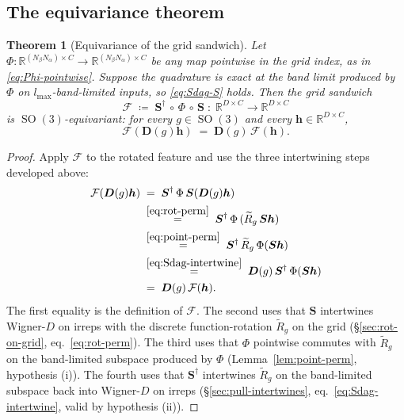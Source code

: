 \documentclass[11pt,a4paper]{article}
\DeclareMathOperator{\SO}{SO}
\newcommand{\R}{\mathbb{R}}
\newcommand{\bh}{\bm{h}}
\newcommand{\bD}{\bm{D}}
\newcommand{\lmax}{l_{\max}}
\theoremstyle{plain}
\newtheorem{theorem}{Theorem}
\theoremstyle{definition}
\theoremstyle{remark}
\begin{document}
\subsection{The equivariance theorem}\label{sec:eqv-thm}

\begin{theorem}[Equivariance of the grid sandwich]\label{thm:grid-sandwich}
    Let $\Phi\colon\R^{(N_\beta N_\alpha)\times C}\to\R^{(N_\beta N_\alpha)\times C}$ be any map pointwise in the grid index, as in \eqref{eq:Phi-pointwise}.
    Suppose the quadrature is exact at the band limit produced by $\Phi$ on $\lmax$-band-limited inputs, so \eqref{eq:Sdag-S} holds.
    Then the grid sandwich
    \begin{equation}\label{eq:sandwich}
        \mathcal{F}\;\coloneqq\;\bm{S}^{\dagger}\,\circ\,\Phi\,\circ\,\bm{S}\;\colon\;\R^{D\times C}\longrightarrow\R^{D\times C}
    \end{equation}
    is $\SO(3)$-equivariant: for every $g\in\SO(3)$ and every $\bh\in\R^{D\times C}$,
    \begin{equation}\label{eq:sandwich-equiv}
        \mathcal{F}(\bD(g)\bh)\;=\;\bD(g)\,\mathcal{F}(\bh).
    \end{equation}
\end{theorem}

\begin{proof}
    Apply $\mathcal{F}$ to the rotated feature and use the three intertwining steps developed above:
    \begin{align*}
        \mathcal{F}(\bD(g)\bh)
        \; & =\;\bm{S}^{\dagger}\,\Phi\,\bm{S}(\bD(g)\bh)                                           \\
        \; & \stackrel{\eqref{eq:rot-perm}}{=}\;\bm{S}^{\dagger}\,\Phi\,(\widetilde R_g\,\bm{S}\bh) \\
        \; & \stackrel{\eqref{eq:point-perm}}{=}\;\bm{S}^{\dagger}\,\widetilde R_g\,\Phi(\bm{S}\bh) \\
        \; & \stackrel{\eqref{eq:Sdag-intertwine}}{=}\;\bD(g)\,\bm{S}^{\dagger}\,\Phi(\bm{S}\bh)    \\
        \; & =\;\bD(g)\,\mathcal{F}(\bh).
    \end{align*}
    The first equality is the definition of $\mathcal{F}$.
    The second uses that $\bm{S}$ intertwines Wigner-$D$ on irreps with the discrete function-rotation $\widetilde R_g$ on the grid (\S\ref{sec:rot-on-grid}, eq.~\eqref{eq:rot-perm}).
    The third uses that $\Phi$ pointwise commutes with $\widetilde R_g$ on the band-limited subspace produced by $\Phi$ (Lemma~\ref{lem:point-perm}, hypothesis (i)).
    The fourth uses that $\bm{S}^{\dagger}$ intertwines $\widetilde R_g$ on the band-limited subspace back into Wigner-$D$ on irreps (\S\ref{sec:pull-intertwines}, eq.~\eqref{eq:Sdag-intertwine}, valid by hypothesis (ii)).
\end{proof}
\end{document}
